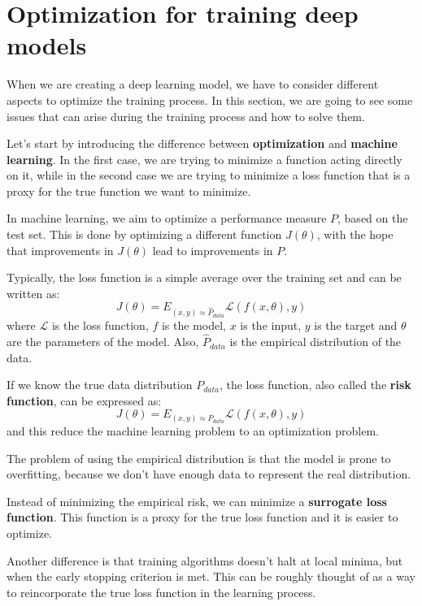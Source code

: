 \section{Optimization for training deep models}
When we are creating a deep learning model, we have to consider different aspects
to optimize the training process. In this section, we are going to see some
issues that can arise during the training process and how to solve them.

Let's start by introducing the difference between \textbf{optimization} and
\textbf{machine learning}. In the first case, we are trying to minimize a function
acting directly on it, while in the second case we are trying to minimize a loss
function that is a proxy for the true function we want to minimize.

In machine learning, we aim to optimize a performance measure $P$, based on the
test set. This is done by optimizing a different function $J(\theta)$, with the
hope that improvements in $J(\theta)$ lead to improvements in $P$.

Typically, the loss function is a simple average over the training set and can be
written as:
\begin{equation}
    J(\theta) = E_{(x, y) \approx \hat{P}_{data}} \mathcal{L}(f(x, \theta), y)
\end{equation}
where $\mathcal{L}$ is the loss function, $f$ is the model, $x$ is the input, $y$
is the target and $\theta$ are the parameters of the model. Also, $\hat{P}_{data}$ is
the empirical distribution of the data.

If we know the true data distribution $P_{data}$, the loss function, also called
the \textbf{risk function}, can be expressed as:
\begin{equation}
    J(\theta) = E_{(x, y) \approx P_{data}} \mathcal{L}(f(x, \theta), y)
\end{equation}
and this reduce the machine learning problem to an optimization problem.

The problem of using the empirical distribution is that the model is prone to
overfitting, because we don't have enough data to represent the real distribution.

Instead of minimizing the empirical risk, we can minimize a \textbf{surrogate
    loss function}. This function is a proxy for the true loss function and it
is easier to optimize.

Another difference is that training algorithms doesn't halt at local minima, but
when the early stopping criterion is met. This can be roughly thought of as a
way to reincorporate the true loss function in the learning process.

